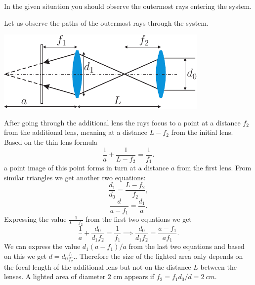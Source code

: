 \hinteng
In the given situation you should observe the outermost rays entering the system.

\solueng
Let us observe the paths of the outermost rays through the system.
\begin{center}
\includegraphics[scale=1.5]{2015-v3g-02-valgustamine-lah}
\end{center}
After going through the additional lens the rays focus to a point at a distance $f_2$ from the additional lens, meaning at a distance $L-f_2$ from the initial lens. Based on the thin lens formula
\begin{equation}
\frac{1}{a}+\frac{1}{L-f_2}=\frac{1}{f_1}.
\end{equation} 
a point image of this point forms in turn at a distance $a$ from the first lens. From similar triangles we get another two equations:
\begin{equation}
\frac{d_1}{d_0}=\frac{L-f_2}{f_2},
\end{equation} 
\begin{equation}
\frac{d}{a-f_1}=\frac{d_1}{a}.
\end{equation}
Expressing the value $\frac{1}{L-f_2}$ from the first two equations we get
\begin{equation}
\frac{1}{a}+\frac{d_0}{d_1f_2}=\frac{1}{f_1}\implies \frac{d_0}{d_1f_2}=\frac{a-f_1}{af_1}.
\end{equation} 
We can express the value $d_1(a-f_1)/a$ from the last two equations and based on this we get $d=d_0\frac{f_1}{f_2}.$. Therefore the size of the lighted area only depends on the focal length of the additional lens but not on the distance $L$ between the lenses. A lighted area of diameter 2 cm appears if $f_2=f_1d_0/d=\SI{2}{cm}$.
\probend